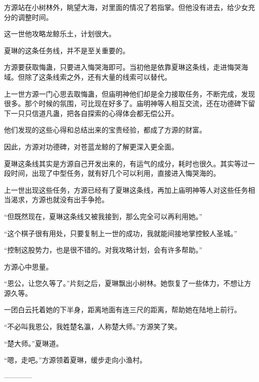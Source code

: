 \begin{this_body}
方源站在小树林外，眺望大海，对里面的情况了若指掌。但他没有进去，给少女充分的调整时间。

这一世他攻略龙鲸乐土，计划很大。

夏琳的这条任务线，并不是至关重要的。

方源要获取悔蛊，只要进入悔哭海即可。当初他是依靠夏琳这条线，走进悔哭海域。但除了这条线索之外，还有大量的线索可以替代。

上一世方源一门心思去取悔蛊，但庙明神他们却是全力接取任务，不断完成，发现很多。那个时候的氛围，可比现在好多了。庙明神等人相互交流，还在功德碑下留下一只只信道凡蛊，把各自探索的心得体会都无偿公开。

他们发现的这些心得和总结出来的宝贵经验，都成了方源的财富。

因此，方源对功德碑，对苍蓝龙鲸的了解更深入更全面。

夏琳这条线其实是方源自己开发出来的，有运气的成分，耗时也很久。其实等过一段时间，出现了中型任务，就有好几个可以利用，直接进入悔哭海的。

上一世出现这些任务，方源已经有了夏琳这条线，再加上庙明神等人对这些任务相当渴求，方源也就没有出手争抢。

“但既然现在，夏琳这条线又被我接到，那么完全可以再利用她。”

“这个棋子很有用处，只要复制上一世的成功，我就能间接地掌控鲛人圣城。”

“控制这股势力，也是很不错的。对我攻略计划，会有许多帮助。”

方源心中思量。

“恩公，让您久等了。”片刻之后，夏琳飘出小树林。她恢复了一些体力，不想让方源久等。

一团白云托着她的下半身，距离地面有连三尺的距离，帮助她在陆地上前行。

“不必叫我恩公，我姓楚名瀛，人称楚大师。”方源笑了笑。

“楚大师。”夏琳道。

“嗯，走吧。”方源领着夏琳，缓步走向小渔村。

------------

\end{this_body}

